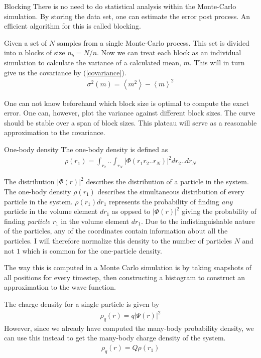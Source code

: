 \documentclass[a4paper, 12pt, titlepage]{article}
\begin{document}
\begin{section}{Blocking}
 There is no need to do statistical analysis within the Monte-Carlo simulation. By storing the data set, one can estimate the error post process. An efficient algorithm for this is called blocking. 

 Given a set of $N$ samples from a single Monte-Carlo process. This set is divided into $n$ blocks of size $n_b = N/n$. Now we can treat each block as an individual simulation to calculate the variance of a calculated mean, $m$. This will in turn give us the covariance by (\ref{covariance}).
 \begin{align*}
 	\sigma^2 (m) = \left<m^2\right> - \left<m\right>^2 
 \end{align*}

 One can not know beforehand which block size is optimal to compute the exact error. One can, however, plot the variance against different block sizes. The curve should be stable over a span of block sizes. This plateau will serve as a reasonable approximation to the covariance. 

\end{section}
\begin{section}{One-body density}
 The one-body density is defined as
 \begin{align*}
 	\rho(r_1) = \int_{r_2} .. \int_{r_N} | \Phi(r_1 r_2 .. r_N) |^2 dr_2 .. dr_N
 \end{align*}

 The distribution $|\Phi(r)|^2$ describes the distribution of a particle in the system. The one-body density $\rho(r_1)$ describes the simultaneous distribution of every particle in the system. $\rho(r_1) dr_1 $ represents the probability of finding \textit{any} particle in the volume element $dr_1$ as oppsed to $|\Phi(r)|^2$ giving the probability of finding \textit{particle $r_1$} in the volume element $dr_1$. Due to the indistinguishable nature of the particles, any of the coordinates contain information about all the particles. I will therefore normalize this density to the number of particles $N$ and not $1$ which is common for the one-particle density. 

 The way this is computed in a Monte Carlo simulation is by taking snapshots of all positions for every timestep, then constructing a histogram to construct an approximation to the wave function.

 The charge density for a single particle is given by 
 \begin{align*}
 	\rho_q (r) = q |\Psi(r)|^2
 \end{align*}
 However, since we already have computed the many-body probability density, we can use this instead to get the many-body charge density of the system. 
 \begin{align*}
 	\rho_q (r) = Q \rho(r_1)
 \end{align*}

\end{section}
\end{document}
